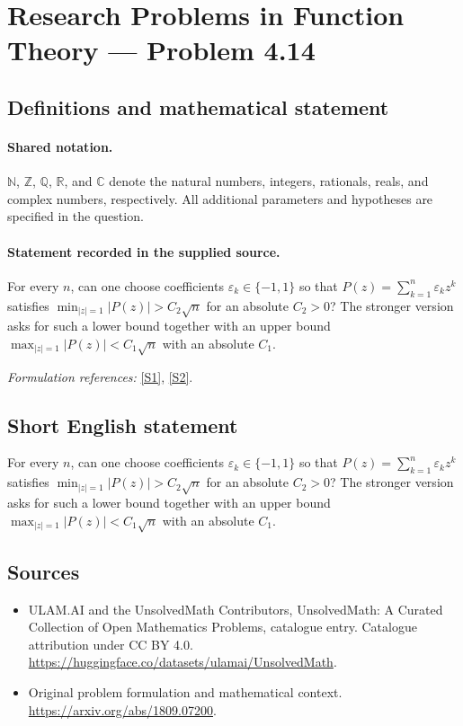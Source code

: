\documentclass[11pt]{article}
\newcommand{\sref}[2]{\hyperlink{source:#1:#2}{[S#2]}}
\begin{document}
\section{Research Problems in Function Theory — Problem 4.14}\label{statement}

\subsection{Definitions and mathematical statement}

\paragraph{Shared notation.}$\mathbb N$, $\mathbb Z$, $\mathbb Q$, $\mathbb R$, and $\mathbb C$ denote the natural numbers, integers, rationals, reals, and complex numbers, respectively. All additional parameters and hypotheses are specified in the question.


\paragraph{Statement recorded in the supplied source.}
For every $n$, can one choose coefficients $\varepsilon_k\in\{-1,1\}$ so that $P(z)=\sum_{k=1}^n\varepsilon_kz^k$ satisfies $\min_{|z|=1}|P(z)|>C_2\sqrt n$ for an absolute $C_2>0$? The stronger version asks for such a lower bound together with an upper bound $\max_{|z|=1}|P(z)|<C_1\sqrt n$ with an absolute $C_1$.
\par\smallskip\textit{Formulation references:} \sref{statement}{1}, \sref{statement}{2}.
\subsection{Short English statement}
For every $n$, can one choose coefficients $\varepsilon_k\in\{-1,1\}$ so that $P(z)=\sum_{k=1}^n\varepsilon_kz^k$ satisfies $\min_{|z|=1}|P(z)|>C_2\sqrt n$ for an absolute $C_2>0$? The stronger version asks for such a lower bound together with an upper bound $\max_{|z|=1}|P(z)|<C_1\sqrt n$ with an absolute $C_1$.
\subsection{Sources}
\begin{itemize}
\item[\hypertarget{source:statement:1}{S1}] ULAM.AI and the UnsolvedMath Contributors, UnsolvedMath: A Curated Collection of Open Mathematics Problems, catalogue entry. Catalogue attribution under CC BY 4.0.
\url{https://huggingface.co/datasets/ulamai/UnsolvedMath}.
\item[\hypertarget{source:statement:2}{S2}] Original problem formulation and mathematical context.
\url{https://arxiv.org/abs/1809.07200}.
\end{itemize}
\label{end:statement}
\end{document}
